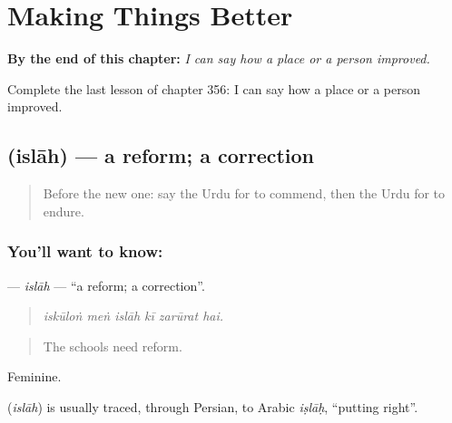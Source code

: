 
\chapter{Making Things Better}
\label{ch:ur-making-things-better}

\begin{chapteropening}
\textbf{By the end of this chapter:} \emph{I can say how a place or a person improved.}

Complete the last lesson of chapter 356: I can say how a place or a person improved.
\end{chapteropening}

\section[\texorpdfstring{\ur{اصلاح} (islāh)}{اصلاح (islāh)}]{ (islāh) — a reform; a correction}

\label{lesson:UR-C356-islah}



\begin{quote}
Before the new one: say the Urdu for to commend, then the Urdu for to endure.
\end{quote}

\subsection*{You'll want to know: }
\textbf{} — \emph{islāh} — \textquotedblleft{}a reform; a correction\textquotedblright{}.

\begin{quote}
     
\end{quote}

\begin{quote}
\emph{iskūloṅ meṅ islāh kī zarūrat hai.}
\end{quote}

\begin{quote}
The schools need reform.
\end{quote}

Feminine.

\begin{cousinweb}
\textbf{} (\emph{islāh}) is usually traced, through Persian, to Arabic \emph{iṣlāḥ}, \textquotedblleft{}putting right\textquotedblright{}.
\end{cousinweb}

